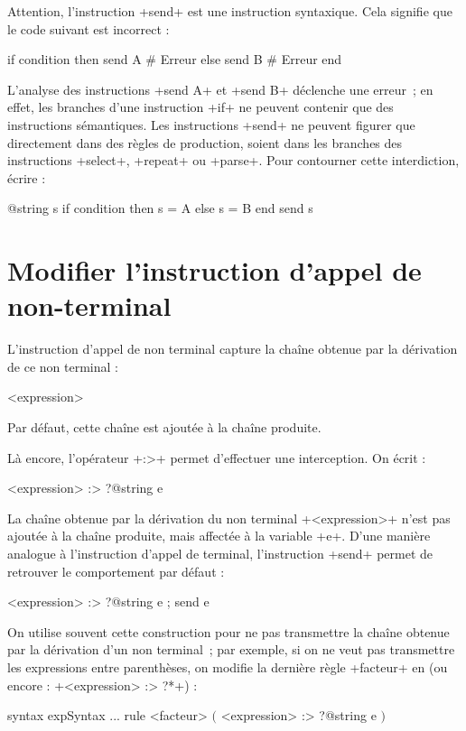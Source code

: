 Attention, l'instruction \ggst+send+ est une instruction syntaxique. Cela signifie que le code suivant est incorrect :

\begin{galgas3}
if condition then
  send A # Erreur
else
  send B # Erreur
end
\end{galgas3}

L'analyse des instructions \ggst+send A+ et  \ggst+send B+ déclenche une erreur~; en effet, les branches d'une instruction \ggst+if+ ne peuvent contenir que des instructions sémantiques. Les instructions \ggst+send+ ne peuvent figurer que directement dans des règles de production, soient dans les branches des instructions \ggst+select+, \ggst+repeat+ ou \ggst+parse+. Pour contourner cette interdiction, écrire :
\begin{galgas3}
@string s
if condition then
  s = A
else
  s = B
end
send s
\end{galgas3}



\section{Modifier l'instruction d'appel de non-terminal}

L'instruction d'appel de non terminal capture la chaîne obtenue par la dérivation de ce non terminal :
\begin{galgas3}
<expression>
\end{galgas3}


Par défaut, cette chaîne est ajoutée à la chaîne produite.

Là encore, l'opérateur \ggst+:>+ permet d'effectuer une interception. On écrit :
\begin{galgas3}
<expression> :> ?@string e
\end{galgas3}

La chaîne obtenue par la dérivation du non terminal \ggst+<expression>+ n'est pas ajoutée à la chaîne produite, mais affectée à la variable \ggst+e+. D'une manière analogue à l'instruction d'appel de terminal, l'instruction \ggst+send+ permet de retrouver le comportement par défaut :
\begin{galgas3}
<expression> :> ?@string e ; send e
\end{galgas3}

On utilise souvent cette construction pour ne pas transmettre la chaîne obtenue par la dérivation d'un non terminal~; par exemple, si on ne veut pas transmettre les expressions entre parenthèses, on modifie la dernière règle \ggst+facteur+ en (ou encore : \ggst+<expression> :> ?*+) :
\begin{galgas3}
syntax expSyntax {
  ...
  rule <facteur> {
    $($
    <expression> :> ?@string e
    $)$
  }
}
\end{galgas3}


